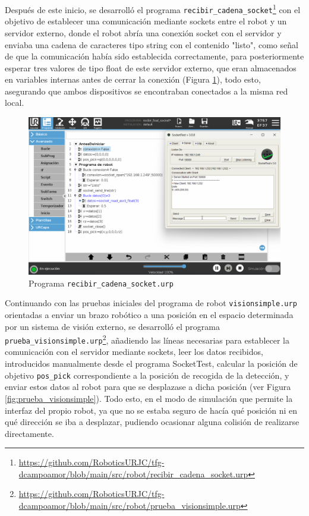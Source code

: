 Después de este inicio, se desarrolló el programa \verb|recibir_cadena_socket|\footnote{\url{https://github.com/RoboticsURJC/tfg-dcampoamor/blob/main/src/robot/recibir_cadena_socket.urp}} con el objetivo de establecer una comunicación mediante sockets entre el robot y un servidor externo, donde el robot abría una conexión socket con el servidor y enviaba una cadena de caracteres tipo string con el contenido "listo", como señal de que la comunicación había sido establecida correctamente, para posteriormente esperar tres valores de tipo float de este servidor externo, que eran almacenados en variables internas antes de cerrar la conexión (Figura \ref{fig:recibir_cadena_socket}), todo esto, asegurando que ambos dispositivos se encontraban conectados a la misma red local.

   \begin{figure}[H]
     \centering
     \begin{center}
       \includegraphics[width=155mm]{figs/recibir_cadena_socket.png}
     \end{center}
     \caption{Programa \texttt{recibir\_cadena\_socket.urp}}
     \label{fig:recibir_cadena_socket}
  \end{figure}

Continuando con las pruebas iniciales del programa de robot \verb|visionsimple.urp| orientadas a enviar un brazo robótico a una posición en el espacio determinada por un sistema de visión externo, se desarrolló el programa \verb|prueba_visionsimple.urp|\footnote{\url{https://github.com/RoboticsURJC/tfg-dcampoamor/blob/main/src/robot/prueba_visionsimple.urp}}, añadiendo las líneas necesarias para establecer la comunicación con el servidor mediante sockets, leer los datos recibidos, introducidos manualmente desde el programa SocketTest, calcular la posición de objetivo \texttt{pos\_pick} correspondiente a la posición de recogida de la detección, y enviar estos datos al robot para que se desplazase a dicha posición (ver Figura \ref{fig:prueba_visionsimple}). Todo esto, en el modo de simulación que permite la interfaz del propio robot, ya que no se estaba seguro de hacía qué posición ni en qué dirección se iba a desplazar, pudiendo ocasionar alguna colisión de realizarse directamente. 

